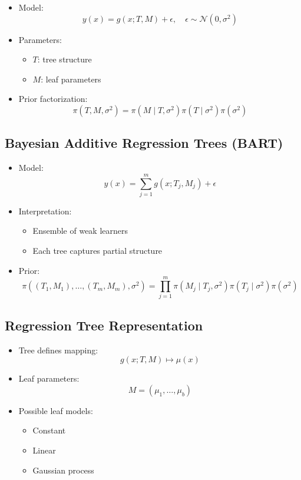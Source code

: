 \documentclass[12pt,oneside]{book}
\numberwithin{equation}{section}
\theoremstyle{definition}
\theoremstyle{plain}
\theoremstyle{remark}
\begin{document}
\begin{itemize}
\item Model:
\[
y(x) = g(x; T, M) + \epsilon, \quad \epsilon \sim \mathcal{N}(0,\sigma^2)
\]

\item Parameters:
\begin{itemize}
\item $T$: tree structure
\item $M$: leaf parameters
\end{itemize}

\item Prior factorization:
\[
\pi(T, M, \sigma^2) = \pi(M \mid T, \sigma^2)\pi(T \mid \sigma^2)\pi(\sigma^2)
\]
\end{itemize}

\subsection{Bayesian Additive Regression Trees (BART)}

\begin{itemize}
\item Model:
\[
y(x) = \sum_{j=1}^m g(x; T_j, M_j) + \epsilon
\]

\item Interpretation:
\begin{itemize}
\item Ensemble of weak learners
\item Each tree captures partial structure
\end{itemize}

\item Prior:
\[
\pi((T_1,M_1),\ldots,(T_m,M_m),\sigma^2)
=
\prod_{j=1}^m \pi(M_j \mid T_j,\sigma^2)\pi(T_j \mid \sigma^2)\pi(\sigma^2)
\]
\end{itemize}

\subsection{Regression Tree Representation}

\begin{itemize}
\item Tree defines mapping:
\[
g(x;T,M) \mapsto \mu(x)
\]

\item Leaf parameters:
\[
M = (\mu_1,\ldots,\mu_b)
\]

\item Possible leaf models:
\begin{itemize}
\item Constant
\item Linear
\item Gaussian process
\end{itemize}
\end{itemize}
\end{document}
